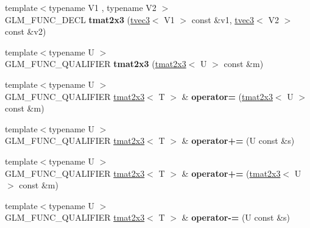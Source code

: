 \begin{DoxyCompactItemize}
\item 
\hypertarget{structglm_1_1detail_1_1tmat2x3_a53c839191a496f91889b4aca31a2ab22}{{\footnotesize template$<$typename V1 , typename V2 $>$ }\\G\-L\-M\-\_\-\-F\-U\-N\-C\-\_\-\-D\-E\-C\-L {\bfseries tmat2x3} (\hyperlink{structglm_1_1detail_1_1tvec3}{tvec3}$<$ V1 $>$ const \&v1, \hyperlink{structglm_1_1detail_1_1tvec3}{tvec3}$<$ V2 $>$ const \&v2)}\label{structglm_1_1detail_1_1tmat2x3_a53c839191a496f91889b4aca31a2ab22}

\item 
\hypertarget{structglm_1_1detail_1_1tmat2x3_a06321f59c5841374f5e068e295a3c29f}{{\footnotesize template$<$typename U $>$ }\\G\-L\-M\-\_\-\-F\-U\-N\-C\-\_\-\-Q\-U\-A\-L\-I\-F\-I\-E\-R {\bfseries tmat2x3} (\hyperlink{structglm_1_1detail_1_1tmat2x3}{tmat2x3}$<$ U $>$ const \&m)}\label{structglm_1_1detail_1_1tmat2x3_a06321f59c5841374f5e068e295a3c29f}

\item 
\hypertarget{structglm_1_1detail_1_1tmat2x3_a9b4788b08ea0e0c8eccd99493c992b61}{{\footnotesize template$<$typename U $>$ }\\G\-L\-M\-\_\-\-F\-U\-N\-C\-\_\-\-Q\-U\-A\-L\-I\-F\-I\-E\-R \hyperlink{structglm_1_1detail_1_1tmat2x3}{tmat2x3}$<$ T $>$ \& {\bfseries operator=} (\hyperlink{structglm_1_1detail_1_1tmat2x3}{tmat2x3}$<$ U $>$ const \&m)}\label{structglm_1_1detail_1_1tmat2x3_a9b4788b08ea0e0c8eccd99493c992b61}

\item 
\hypertarget{structglm_1_1detail_1_1tmat2x3_a72883b586f1bff7fdf53120a6b0f2eeb}{{\footnotesize template$<$typename U $>$ }\\G\-L\-M\-\_\-\-F\-U\-N\-C\-\_\-\-Q\-U\-A\-L\-I\-F\-I\-E\-R \hyperlink{structglm_1_1detail_1_1tmat2x3}{tmat2x3}$<$ T $>$ \& {\bfseries operator+=} (U const \&s)}\label{structglm_1_1detail_1_1tmat2x3_a72883b586f1bff7fdf53120a6b0f2eeb}

\item 
\hypertarget{structglm_1_1detail_1_1tmat2x3_a06f471d9051fcb92b1ec94eb3aea08fa}{{\footnotesize template$<$typename U $>$ }\\G\-L\-M\-\_\-\-F\-U\-N\-C\-\_\-\-Q\-U\-A\-L\-I\-F\-I\-E\-R \hyperlink{structglm_1_1detail_1_1tmat2x3}{tmat2x3}$<$ T $>$ \& {\bfseries operator+=} (\hyperlink{structglm_1_1detail_1_1tmat2x3}{tmat2x3}$<$ U $>$ const \&m)}\label{structglm_1_1detail_1_1tmat2x3_a06f471d9051fcb92b1ec94eb3aea08fa}

\item 
\hypertarget{structglm_1_1detail_1_1tmat2x3_a41dd674efebd954f906852a8adbb2106}{{\footnotesize template$<$typename U $>$ }\\G\-L\-M\-\_\-\-F\-U\-N\-C\-\_\-\-Q\-U\-A\-L\-I\-F\-I\-E\-R \hyperlink{structglm_1_1detail_1_1tmat2x3}{tmat2x3}$<$ T $>$ \& {\bfseries operator-\/=} (U const \&s)}\label{structglm_1_1detail_1_1tmat2x3_a41dd674efebd954f906852a8adbb2106}


\end{DoxyCompactItemize}
